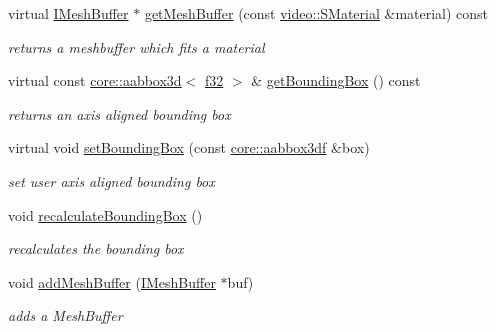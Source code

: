\begin{DoxyCompactItemize}
virtual \hyperlink{classirr_1_1scene_1_1IMeshBuffer}{I\+Mesh\+Buffer} $\ast$ \hyperlink{structirr_1_1scene_1_1SMesh_a768eeba9148e949d6962bee08517a056}{get\+Mesh\+Buffer} (const \hyperlink{classirr_1_1video_1_1SMaterial}{video\+::\+S\+Material} \&material) const
\begin{DoxyCompactList}\small\item\em returns a meshbuffer which fits a material \end{DoxyCompactList}\item 
\mbox{\label{structirr_1_1scene_1_1SMesh_a379e330c863acdade37e65275903158d}} 
virtual const \hyperlink{classirr_1_1core_1_1aabbox3d}{core\+::aabbox3d}$<$ \hyperlink{namespaceirr_a0277be98d67dc26ff93b1a6a1d086b07}{f32} $>$ \& \hyperlink{structirr_1_1scene_1_1SMesh_a379e330c863acdade37e65275903158d}{get\+Bounding\+Box} () const
\begin{DoxyCompactList}\small\item\em returns an axis aligned bounding box \end{DoxyCompactList}\item 
\mbox{\label{structirr_1_1scene_1_1SMesh_a636e4df4054b2ed2911808cfb6df5cb3}} 
virtual void \hyperlink{structirr_1_1scene_1_1SMesh_a636e4df4054b2ed2911808cfb6df5cb3}{set\+Bounding\+Box} (const \hyperlink{namespaceirr_1_1core_a60f4b4c744aba55f10530d503c6ecb04}{core\+::aabbox3df} \&box)
\begin{DoxyCompactList}\small\item\em set user axis aligned bounding box \end{DoxyCompactList}\item 
\mbox{\label{structirr_1_1scene_1_1SMesh_a7a16bc83094ab242ae779baf817dc7f9}} 
void \hyperlink{structirr_1_1scene_1_1SMesh_a7a16bc83094ab242ae779baf817dc7f9}{recalculate\+Bounding\+Box} ()
\begin{DoxyCompactList}\small\item\em recalculates the bounding box \end{DoxyCompactList}\item 
void \hyperlink{structirr_1_1scene_1_1SMesh_a890e7506262b2ebaf45ff95c681452bd}{add\+Mesh\+Buffer} (\hyperlink{classirr_1_1scene_1_1IMeshBuffer}{I\+Mesh\+Buffer} $\ast$buf)
\begin{DoxyCompactList}\small\item\em adds a Mesh\+Buffer \end{DoxyCompactList}\item 

\end{DoxyCompactItemize}
